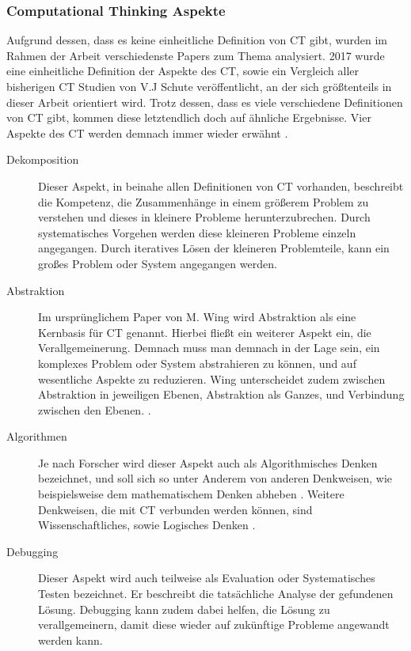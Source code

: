 \subsubsection{Computational Thinking Aspekte}
Aufgrund dessen, dass es keine einheitliche Definition von CT gibt, wurden im Rahmen der Arbeit verschiedenste Papers zum Thema analysiert. 2017 wurde eine einheitliche Definition der Aspekte des CT, sowie ein Vergleich aller bisherigen CT Studien von V.J Schute \cite{schute} veröffentlicht, an der sich größtenteils in dieser Arbeit orientiert wird.
Trotz dessen, dass es viele verschiedene Definitionen von CT gibt, kommen diese letztendlich doch auf ähnliche Ergebnisse. Vier Aspekte des CT werden demnach immer wieder erwähnt \cite{schute}.

\begin{description}
    \item[Dekomposition] Dieser Aspekt, in beinahe allen Definitionen von CT vorhanden, beschreibt die Kompetenz, die Zusammenhänge in einem größerem Problem zu verstehen und dieses in kleinere Probleme herunterzubrechen. Durch systematisches Vorgehen werden diese kleineren Probleme einzeln angegangen. Durch iteratives Lösen der kleineren Problemteile, kann ein großes Problem oder System angegangen werden.
    \item[Abstraktion] Im ursprünglichem Paper von M. Wing wird Abstraktion als eine Kernbasis für CT genannt. Hierbei fließt ein weiterer Aspekt ein, die Verallgemeinerung.
    Demnach muss man demnach in der Lage sein, ein komplexes Problem oder System abstrahieren zu können, und auf wesentliche Aspekte zu reduzieren. Wing unterscheidet zudem zwischen Abstraktion in jeweiligen Ebenen, Abstraktion als Ganzes, und Verbindung zwischen den Ebenen. \cite{wing2008}.
    \item[Algorithmen] Je nach Forscher wird dieser Aspekt auch als Algorithmisches Denken bezeichnet, und soll sich so unter Anderem von anderen Denkweisen, wie beispielsweise dem mathematischem Denken abheben \cite{schute}. Weitere Denkweisen, die mit CT verbunden werden können, sind Wissenschaftliches, sowie Logisches Denken \cite{curzon}.
    \item[Debugging] Dieser Aspekt wird auch teilweise als Evaluation \cite{curzon} oder Systematisches Testen \cite{wing2006} bezeichnet. Er beschreibt die tatsächliche Analyse der gefundenen Lösung. Debugging kann zudem dabei helfen, die Lösung zu verallgemeinern, damit diese wieder auf zukünftige Probleme angewandt werden kann.
\end{description}

